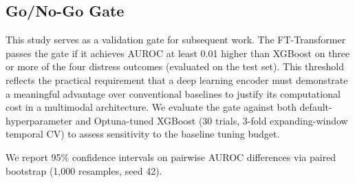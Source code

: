 \subsection{Go/No-Go Gate}
\label{sec:gate}

This study serves as a validation gate for subsequent work. The FT-Transformer passes the gate if it achieves AUROC at least 0.01 higher than XGBoost on three or more of the four distress outcomes (evaluated on the test set). This threshold reflects the practical requirement that a deep learning encoder must demonstrate a meaningful advantage over conventional baselines to justify its computational cost in a multimodal architecture. We evaluate the gate against both default-hyperparameter and Optuna-tuned XGBoost (30 trials, 3-fold expanding-window temporal CV) to assess sensitivity to the baseline tuning budget.

We report 95\% confidence intervals on pairwise AUROC differences via paired bootstrap (1{,}000 resamples, seed 42).

